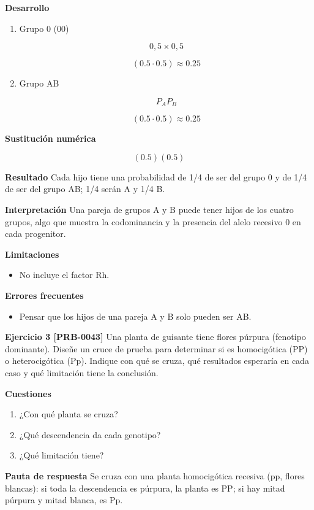 \documentclass{book}
\begin{document}
\noindent\textbf{Desarrollo}
\begin{enumerate}
\item
Grupo 0 (00)


\[
0{,}5 \times 0{,}5
\]

\[
\left(0.5\cdot 0.5\right) \approx 0.25
\]
\item
Grupo AB


\[
P_A P_B
\]

\[
\left(0.5\cdot 0.5\right) \approx 0.25
\]
\end{enumerate}

\noindent\textbf{Sustitución numérica}

\[
\left(0.5\right) \left(0.5\right)
\]

\noindent\textbf{Resultado}
Cada hijo tiene una probabilidad de 1/4 de ser del grupo 0 y de 1/4 de ser del grupo AB; 1/4 serán A y 1/4 B.


\noindent\textbf{Interpretación}
Una pareja de grupos A y B puede tener hijos de los cuatro grupos, algo que muestra la codominancia y la presencia del alelo recesivo 0 en cada progenitor.


\noindent\textbf{Limitaciones}
\begin{itemize}
\item No incluye el factor Rh.
\end{itemize}

\noindent\textbf{Errores frecuentes}
\begin{itemize}
\item Pensar que los hijos de una pareja A y B solo pueden ser AB.
\end{itemize}

\noindent\textbf{Ejercicio 3 [PRB-0043]}
Una planta de guisante tiene flores púrpura (fenotipo dominante). Diseñe un cruce de prueba para determinar si es homocigótica (PP) o heterocigótica (Pp). Indique con qué se cruza, qué resultados esperaría en cada caso y qué limitación tiene la conclusión.


\noindent\textbf{Cuestiones}
\begin{enumerate}
\item ¿Con qué planta se cruza?
\item ¿Qué descendencia da cada genotipo?
\item ¿Qué limitación tiene?
\end{enumerate}

\noindent\textbf{Pauta de respuesta}
Se cruza con una planta homocigótica recesiva (pp, flores blancas): si toda la descendencia es púrpura, la planta es PP; si hay mitad púrpura y mitad blanca, es Pp.
\end{document}
